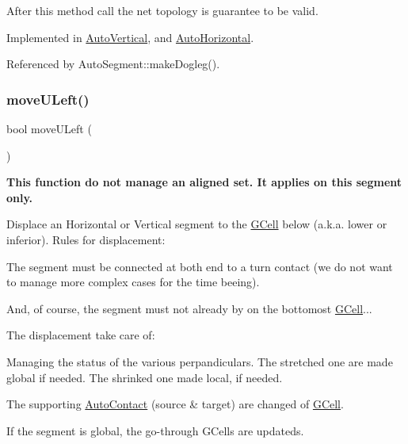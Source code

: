 After this method call the net topology is guarantee to be valid.

  

Implemented in \mbox{\hyperlink{classKatabatic_1_1AutoVertical_a36c0eecad40d3559b5378caefec6a7e0}{Auto\+Vertical}}, and \mbox{\hyperlink{classKatabatic_1_1AutoHorizontal_a36c0eecad40d3559b5378caefec6a7e0}{Auto\+Horizontal}}.



Referenced by Auto\+Segment\+::make\+Dogleg().

\mbox{\label{classKatabatic_1_1AutoSegment_af8ca7b17e952f4b599aeeb2f4e5be395}} 
\subsubsection{\texorpdfstring{move\+U\+Left()}{moveULeft()}}
{\footnotesize\ttfamily bool move\+U\+Left (\begin{DoxyParamCaption}{ }\end{DoxyParamCaption})\hspace{0.3cm}{\ttfamily [pure virtual]}}

{\bfseries This function do not manage an aligned set. It applies on {\ttfamily this} segment only.}

Displace an Horizontal or Vertical segment to the \mbox{\hyperlink{classKatabatic_1_1GCell}{G\+Cell}} below (a.\+k.\+a. lower or inferior). Rules for displacement\+:
\begin{DoxyItemize}
\item The segment must be connected at both end to a turn contact (we do not want to manage more complex cases for the time beeing).
\item And, of course, the segment must not already by on the bottomost \mbox{\hyperlink{classKatabatic_1_1GCell}{G\+Cell}}...
\end{DoxyItemize}

The displacement take care of\+:
\begin{DoxyItemize}
\item Managing the status of the various perpandiculars. The stretched one are made global if needed. The shrinked one made local, if needed.
\item The supporting \mbox{\hyperlink{classKatabatic_1_1AutoContact}{Auto\+Contact}} (source \& target) are changed of \mbox{\hyperlink{classKatabatic_1_1GCell}{G\+Cell}}.
\item If the segment is global, the go-\/through G\+Cells are updateds.
\end{DoxyItemize}

